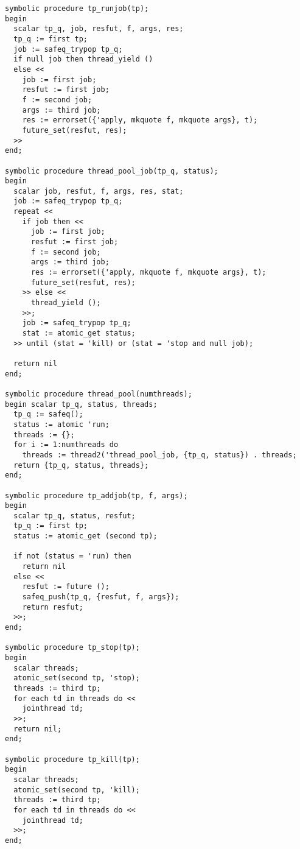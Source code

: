 \begin{code}
\begin{verbatim}
symbolic procedure tp_runjob(tp);
begin
  scalar tp_q, job, resfut, f, args, res;
  tp_q := first tp;
  job := safeq_trypop tp_q;
  if null job then thread_yield ()
  else <<
    job := first job;
    resfut := first job;
    f := second job;
    args := third job;
    res := errorset({'apply, mkquote f, mkquote args}, t);
    future_set(resfut, res);
  >>
end;

symbolic procedure thread_pool_job(tp_q, status);
begin
  scalar job, resfut, f, args, res, stat;
  job := safeq_trypop tp_q;
  repeat <<
    if job then <<
      job := first job;
      resfut := first job;
      f := second job;
      args := third job;
      res := errorset({'apply, mkquote f, mkquote args}, t);
      future_set(resfut, res);
    >> else <<
      thread_yield ();
    >>;
    job := safeq_trypop tp_q;
    stat := atomic_get status;
  >> until (stat = 'kill) or (stat = 'stop and null job);

  return nil
end;

symbolic procedure thread_pool(numthreads);
begin scalar tp_q, status, threads;
  tp_q := safeq();
  status := atomic 'run;
  threads := {};
  for i := 1:numthreads do 
    threads := thread2('thread_pool_job, {tp_q, status}) . threads;
  return {tp_q, status, threads};
end;

symbolic procedure tp_addjob(tp, f, args);
begin
  scalar tp_q, status, resfut;
  tp_q := first tp;
  status := atomic_get (second tp);

  if not (status = 'run) then
    return nil
  else <<
    resfut := future ();
    safeq_push(tp_q, {resfut, f, args});
    return resfut;
  >>;
end;

symbolic procedure tp_stop(tp);
begin
  scalar threads;
  atomic_set(second tp, 'stop);
  threads := third tp;
  for each td in threads do <<
    jointhread td;
  >>;
  return nil;
end;

symbolic procedure tp_kill(tp);
begin
  scalar threads;
  atomic_set(second tp, 'kill);
  threads := third tp;
  for each td in threads do <<
    jointhread td;
  >>;
end;
\end{verbatim}
\end{code}